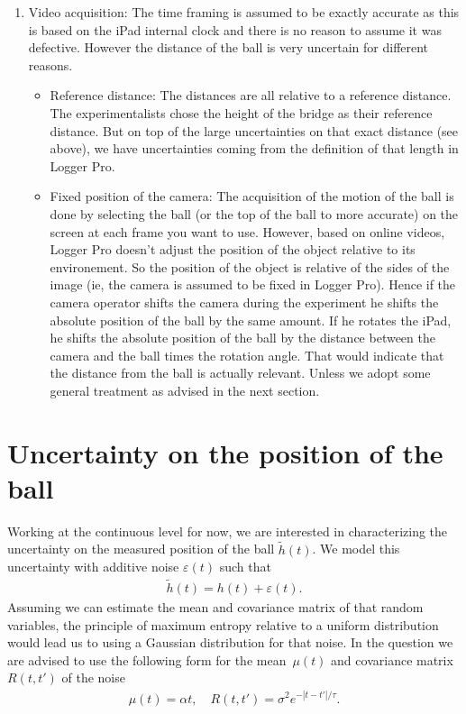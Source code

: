 \documentclass{article}
\begin{document}
\begin{enumerate}
 \item Video acquisition: The time framing is assumed to be exactly accurate as this is based on the iPad internal clock and there is no reason to assume it was defective. However the distance of the ball is very uncertain for different reasons.
\begin{itemize}
 \item Reference distance: The distances are all relative to a reference distance. The experimentalists chose the height of the bridge as their reference distance. But on top of the large uncertainties on that exact distance (see above), we have uncertainties coming from the definition of that length in Logger Pro.
 \item Fixed position of the camera: The acquisition of the motion of the ball is done by selecting the ball (or the top of the ball to more accurate) on the screen at each frame you want to use. However, based on online videos, Logger Pro doesn't adjust the position of the object relative to its environement. So the position of the object is relative of the sides of the image (ie, the camera is assumed to be fixed in Logger Pro). Hence if the camera operator shifts the camera during the experiment he shifts the absolute position of the ball by the same amount. If he rotates the iPad, he shifts the absolute position of the ball by the distance between the camera and the ball times the rotation angle. That would indicate that the distance from the ball is actually relevant. Unless we adopt some general treatment as advised in the next section.
\end{itemize}
\end{enumerate}

\section{Uncertainty on the position of the ball}

Working at the continuous level for now, we are interested in characterizing the uncertainty on the measured position of the ball $\tilde{h}(t)$. 
We model this uncertainty with additive noise $\varepsilon(t)$ such that
\begin{align*}
 \tilde{h}(t) = h(t) + \varepsilon(t).
\end{align*}
Assuming we can estimate the mean and covariance matrix of that random variables, the principle of maximum entropy relative to a uniform distribution would lead us to using a Gaussian distribution for that noise.
In the question we are advised to use the following form for the mean~$\mu(t)$ and covariance matrix~$R(t,t')$ of the noise
\begin{align*}
 \mu(t) = \alpha t , \quad R(t,t') = \sigma^2 e^{-|t-t'|/\tau} .
\end{align*}
\end{document}
